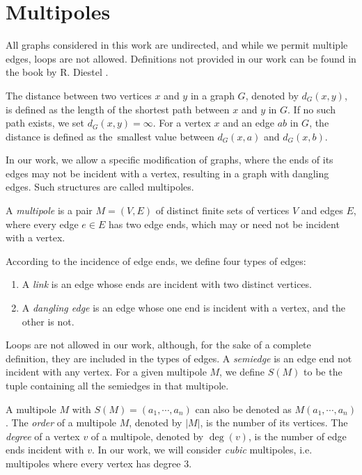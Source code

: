 \section{Multipoles}\label{sec:multipoles}

All graphs considered in this work are undirected, and while we permit multiple edges, loops are not allowed. Definitions not provided in our work can be found in the book  by R. Diestel \cite{Diestel2010}.

The distance between two vertices $x$ and $y$ in a graph $G$, denoted by $d_G(x,y)$, is defined as the length of the shortest path between $x$ and $y$ in $G$. If no such path exists, we set $d_G(x,y)=\infty$. For a vertex $x$ and an edge $ab$ in $G$, the distance is defined as the~smallest value between $d_G(x,a)$ and $d_G(x,b)$.

In our work, we allow a specific modification of graphs, where the ends of its edges may not be incident with a vertex, resulting in a graph with dangling edges. Such structures are called multipoles.

\begin{definition}
	A \textit{multipole} is a pair $M=(V,E)$ of distinct finite sets of vertices $V$ and edges $E$, where every edge $e\in E$ has two edge ends, which may or need not be incident with a vertex.
	
	According to the incidence of edge ends, we define four types of edges:
	\begin{enumerate}[nolistsep]
		\item A \textit{link} is an edge whose ends are incident with two distinct vertices.
		\item A \textit{dangling edge} is an edge whose one end is incident with a vertex, and the other is not.
	\end{enumerate}
\end{definition}

Loops are not allowed in our work, although, for the sake of a complete definition, they are included in the types of edges. A \textit{semiedge} is an edge end not incident with any vertex. For a given multipole $M$, we define $S(M)$ to be the tuple containing all the semiedges in that multipole.

A multipole $M$ with $S(M) = (a_1, \cdots, a_n)$ can also be denoted as $M(a_1,\cdots,a_n)$. The \textit{order} of a multipole $M$, denoted by $|M|$, is the number of its vertices. The \textit{degree} of a vertex $v$ of a multipole, denoted by $\deg(v)$, is the number of edge ends incident with $v$. In our work, we will consider \textit{cubic} multipoles, i.e. multipoles where every vertex has degree $3$. 

